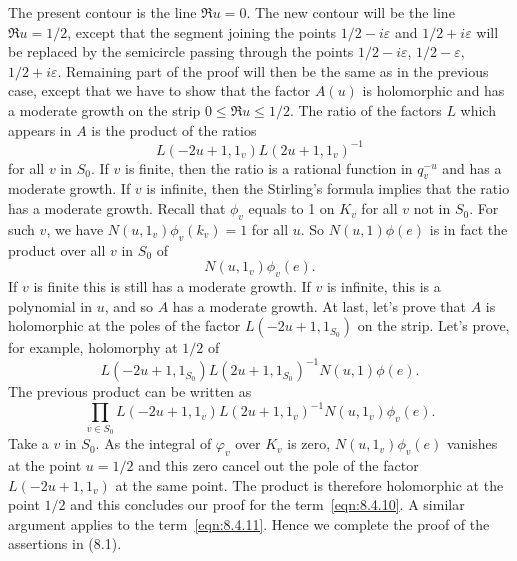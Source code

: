 The present contour is the line $\Re u = 0$.
The new contour will be the line $\Re u = 1/2$,
except that the segment joining the points $1/2-i\varepsilon$ and $1/2+i\varepsilon$ will be replaced by the semicircle passing through the points $1 /2-i\varepsilon$, $1/2-\varepsilon$, $1/2+i\varepsilon$. 
Remaining part of the proof will then be the same as in the previous case, except that we have to show that the factor $A(u)$ is holomorphic and has a moderate growth on the strip $0\leq \Re u \leq 1/2$.
The ratio of the factors $L$ which appears in $A$ is the product of the ratios
\begin{equation*}
    L(-2u+1, 1_v) L(2u+1, 1_v)^{-1}
\end{equation*}
for all $v$ in $S_0$.
If $v$ is finite, then the ratio is a rational function in $q_v^{-u}$ and has a moderate growth.
If $v$ is infinite, then the Stirling's formula implies that the ratio has a moderate growth.
Recall that $\phi_v$ equals to 1 on $K_v$ for all $v$ not in $S_0$.
For such $v$, we have $N(u, 1_v)\phi_v(k_v)=1$ for all $u$. 
So $N(u, 1)\phi(e)$  is in fact the product over all $v$ in $S_0$ of
\begin{equation*}
    N(u, 1_v) \phi_v(e).
\end{equation*}
If $v$ is finite this is still has a moderate growth.
If $v$ is infinite, this is a polynomial in $u$, and so $A$ has a moderate growth.
At last, let's prove that $A$ is holomorphic at the poles of the factor $L(-2u+1, 1_{S_0})$ on the strip.
Let's prove, for example, holomorphy at $1/2$ of 
\begin{equation*}
    L(-2u+1, 1_{S_0})L(2u+1, 1_{S_0})^{-1} N(u, 1)\phi(e).
\end{equation*}
The previous product can be written as
\begin{equation*}
    \prod_{v\in S_0}L(-2u+1, 1_v)L(2u+1, 1_v)^{-1} N(u, 1_v) \phi_v(e).
\end{equation*}
Take a $v$ in $S_0$.
As the integral of $\varphi_v$ over $K_v$ is zero,
$N(u, 1_v)\phi_v(e)$ vanishes at the point $u=1/2$ and this zero cancel out the pole of the factor $L (-2u+1, 1_v)$ at the same point.
The product is therefore holomorphic at the point $1/2$ and this concludes our proof for the term~\eqref{eqn:8.4.10}.
A similar argument applies to the term~\eqref{eqn:8.4.11}.
Hence we complete the proof of the assertions in (8.1).